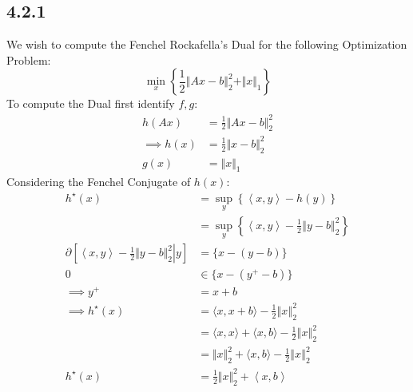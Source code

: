 \documentclass[]{article}
\begin{document}
    \subsection*{4.2.1}
        We wish to compute the Fenchel Rockafella's Dual for the following Optimization Problem: 
        $$
            \min_{x} \left\lbrace
                \frac{1}{2}\left\Vert
                     Ax - b
                \right\Vert_2^2 + \Vert x\Vert_1
            \right\rbrace
        $$
        To compute the Dual first identify $f, g$: 
        \begin{align*}\tag{4.2.1.1}\label{eqn:4.2.1.1}
            h(Ax) &= \frac{1}{2}\Vert Ax - b\Vert_2^2 
            \\
            \implies h(x) &= \frac{1}{2}\Vert x - b\Vert_2^2
            \\
            g(x) &= \Vert x \Vert_1
        \end{align*}
        Considering the Fenchel Conjugate of $h(x)$: 
        \begin{align*}\tag{4.2.1.2}\label{eqn:4.2.1.2}
            h^\star(x) &= \sup_{y} \left\lbrace
                \left\langle x, y \right\rangle - h(y)
            \right\rbrace
            \\
            &= \sup_{y} \left\lbrace
                \left\langle x, y \right\rangle - 
                \frac{1}{2}\left\Vert
                    y - b
                \right\Vert_2^2
            \right\rbrace
            \\
            \partial\left[
                \left.
                    \left\langle x, y \right\rangle 
                    -
                    \frac{1}{2} \Vert y - b\Vert_2^2
                \right| y
                \right] &= \{x - (y - b)\}
            \\
            0 &\in \{x - (y^+ - b)\}
            \\
            \implies
            y^+ &= x + b
            \\
            \implies 
            h^\star(x) &= \langle 
            x, x + b
            \rangle - \frac{1}{2}\left\Vert
                x
            \right\Vert_2^2
            \\
            &= 
            \langle x, x\rangle + \langle x, b\rangle - 
            \frac{1}{2}\left\Vert
                x
            \right\Vert_2^2
            \\
            &= 
            \Vert x\Vert_2^2 + \langle x, b\rangle - 
            \frac{1}{2}\left\Vert
                x
            \right\Vert_2^2
            \\
            h^\star(x)
            &= \frac{1}{2}\Vert x\Vert_2^2 + \left\langle 
                x, b
            \right\rangle
        \end{align*}
\end{document}
